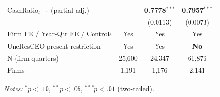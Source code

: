 \begin{table}[htbp]
\begin{tabular}{lccc}
\quad CashRatio$_{t-1}$ (partial adj.) & --- & \textbf{0.7778}$^{***}$ & \textbf{0.7957}$^{***}$ \\
 &  & (0.0113) & (0.0073) \\
\midrule
Firm FE / Year-Qtr FE / Controls & Yes & Yes & Yes \\
UncResCEO-present restriction & Yes & Yes & \textbf{No} \\
N (firm-quarters) & 25,600 & 24,347 & 61,876 \\
Firms & 1,191 & 1,176 & 2,141 \\
\bottomrule
\end{tabular}
\begin{minipage}{\linewidth}\vspace{2pt}\scriptsize
\textit{Notes:} $^{*}p<.10$, $^{**}p<.05$, $^{***}p<.01$ (two-tailed).
\end{minipage}
\end{table}